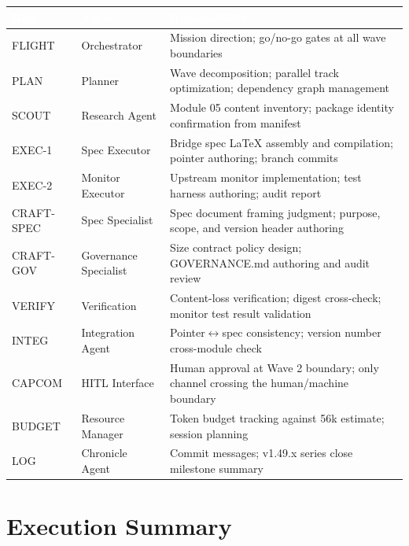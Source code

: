 \documentclass[11pt,letterpaper]{article}
\newcommand{\tableheader}[1]{\textbf{\sffamily\textcolor{white}{#1}}}
\begin{document}
\begin{center}
\begin{tabularx}{\textwidth}{L{2cm}L{3cm}X}
\toprule
{}
\tableheader{Role} & \tableheader{Agent} & \tableheader{Responsibility} \\
\midrule
FLIGHT & Orchestrator & Mission direction; go/no-go gates at all wave boundaries \\
PLAN & Planner & Wave decomposition; parallel track optimization; dependency graph management \\
SCOUT & Research Agent & Module 05 content inventory; package identity confirmation from manifest \\
EXEC-1 & Spec Executor & Bridge spec LaTeX assembly and compilation; pointer authoring; branch commits \\
EXEC-2 & Monitor Executor & Upstream monitor implementation; test harness authoring; audit report \\
CRAFT-SPEC & Spec Specialist & Spec document framing judgment; purpose, scope, and version header authoring \\
CRAFT-GOV & Governance Specialist & Size contract policy design; GOVERNANCE.md authoring and audit review \\
VERIFY & Verification & Content-loss verification; digest cross-check; monitor test result validation \\
INTEG & Integration Agent & Pointer$\leftrightarrow$spec consistency; version number cross-module check \\
CAPCOM & HITL Interface & Human approval at Wave 2 boundary; only channel crossing the human/machine boundary \\
BUDGET & Resource Manager & Token budget tracking against 56k estimate; session planning \\
LOG & Chronicle Agent & Commit messages; v1.49.x series close milestone summary \\
\bottomrule
\end{tabularx}
\end{center}

\section{Execution Summary}
\end{document}
